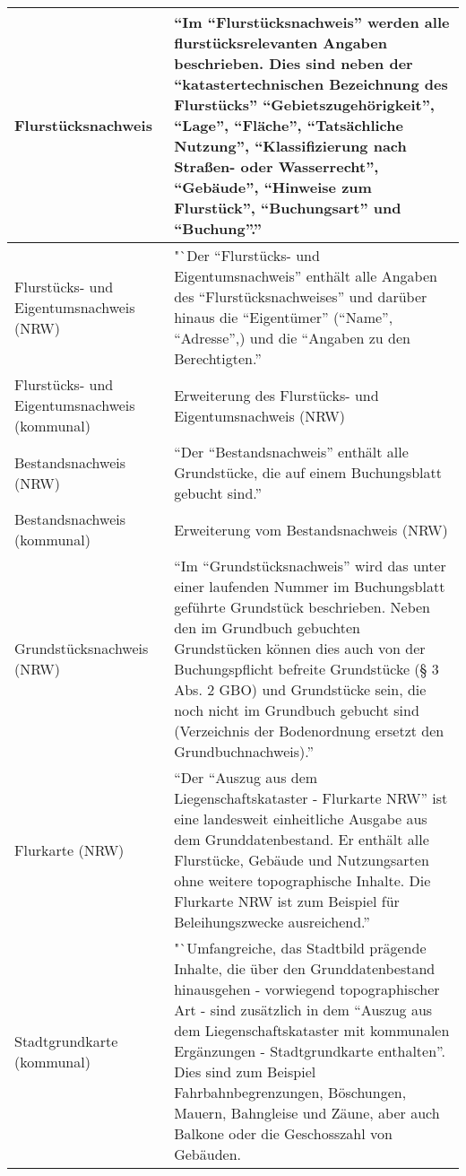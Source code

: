 \begin{longtable}{|p{}|p{}|}
	Flurstücksnachweis
	&
	"`Im "`Flurstücksnachweis"' werden alle flurstücksrelevanten Angaben beschrieben.
	Dies sind neben der "`katastertechnischen Bezeichnung des Flurstücks"' "`Gebietszugehörigkeit"', "`Lage"',
	"`Fläche"', "`Tatsächliche Nutzung"', "`Klassifizierung nach Straßen- oder Wasserrecht"', "`Gebäude"', "`Hinweise zum Flurstück"', "`Buchungsart"' und "`Buchung"'."' \autocite[269]{adv-alkis-erlaeuterung}
	\\ 
	\hline
	Flurstücks- und Eigentumsnachweis (NRW)
	&
	"`Der "`Flurstücks- und Eigentumsnachweis"' enthält alle Angaben des "`Flurstücksnachweises"'
	und darüber hinaus die "`Eigentümer"' ("`Name"', "`Adresse"',) und die "`Angaben zu den Berechtigten."' \autocite[269]{adv-alkis-erlaeuterung} \\
	\hline
	Flurstücks- und Eigentumsnachweis (kommunal)
	&
	Erweiterung des Flurstücks- und Eigentumsnachweis (NRW)\\
	\hline
	Bestandsnachweis (NRW)
	&
	"`Der "`Bestandsnachweis"' enthält alle Grundstücke, die auf einem Buchungsblatt gebucht sind."' \autocite[269]{adv-alkis-erlaeuterung}  \\
	\hline
	Bestandsnachweis (kommunal)
	&
	Erweiterung vom Bestandsnachweis (NRW) \\
	\hline
	Grundstücksnachweis (NRW)
	&
	"`Im "`Grundstücksnachweis"' wird das unter einer laufenden Nummer im Buchungsblatt geführte Grundstück beschrieben. Neben den im Grundbuch gebuchten Grundstücken können
	dies auch von der Buchungspflicht befreite Grundstücke (§ 3 Abs. 2 GBO) und Grundstücke
	sein, die noch nicht im Grundbuch gebucht sind (Verzeichnis der Bodenordnung ersetzt den
	Grundbuchnachweis)."' \autocite[269]{adv-alkis-erlaeuterung}\\
	\hline
	Flurkarte (NRW)
	&
	"`Der "`Auszug aus dem Liegenschaftskataster - Flurkarte NRW"'  ist eine landesweit einheitliche Ausgabe aus dem Grunddatenbestand. Er enthält alle Flurstücke, Gebäude und Nutzungsarten ohne weitere topographische Inhalte. Die Flurkarte NRW ist zum Beispiel für Beleihungszwecke ausreichend."' \autocite{wupp-alkis} \\
	\hline
	Stadtgrundkarte (kommunal)
	&
	"`Umfangreiche, das Stadtbild prägende Inhalte, die über den Grunddatenbestand hinausgehen - vorwiegend topographischer Art - sind zusätzlich in dem "`Auszug aus dem Liegenschaftskataster mit kommunalen Ergänzungen - Stadtgrundkarte enthalten"'.
	Dies sind zum Beispiel Fahrbahnbegrenzungen, Böschungen, Mauern, Bahngleise und Zäune, aber auch Balkone oder die Geschosszahl von Gebäuden. 
						

\end{longtable}
